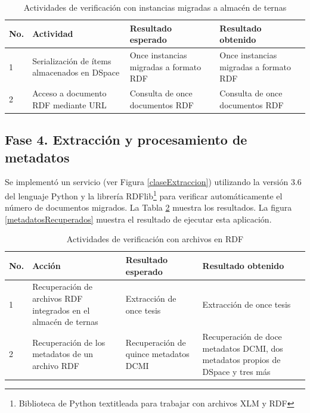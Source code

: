 \begin{table}[htbp]
    \begin{center}
    \caption{Actividades de verificaci\'on con instancias migradas a almac\'en de ternas}
    \begin{tabular}{| p{1.5cm}| p{3.5cm} | p{3.5cm} | p{3.5cm} |}
    \hline
    \centering \textbf{No. } & \textbf{Actividad} & \textbf{Resultado esperado} & \textbf{Resultado obtenido} \\
    \hline \hline
    1 & Serializaci\'on de \'items almacenados en DSpace & Once instancias migradas a formato RDF & Once instancias migradas a formato RDF \\ \hline
    2 & Acceso a documento RDF mediante URL & Consulta de once documentos RDF & Consulta de once documentos RDF  \\ \hline
    \end{tabular}
    \label{tablaInstanciasRdf}
    \end{center}
\end{table}

\subsection{Fase 4. Extracci\'on y procesamiento de metadatos}

Se implement\'o un servicio (ver Figura \ref{claseExtraccion}) utilizando la versi\'on 3.6 del lenguaje Python y la librer\'ia RDFlib\footnote{Biblioteca de Python textitleada para trabajar con archivos XLM y RDF} para verificar autom\'aticamente el n\'umero de documentos migrados. La Tabla \ref{casosPruebaMetadatos} muestra los resultados. La figura \ref{metadatosRecuperados} muestra el resultado de ejecutar esta aplicaci\'on.\newline

\begin{table}[htbp]
    \begin{center}
    \caption{Actividades de verificaci\'on con archivos en RDF}
    \begin{tabular}{| p{1.5cm}| p{3.5cm} | p{3.5cm} | p{3.5cm} |}
    \hline
    \centering \textbf{No. } & \textbf{Acci\'on} & \textbf{Resultado esperado} & \textbf{Resultado obtenido} \\
    \hline \hline
    1 & Recuperaci\'on de archivos RDF integrados en el almac\'en de ternas  & Extracci\'on de once tesis & Extracci\'on de once tesis \\ \hline
    2 & Recuperaci\'on de los metadatos de un archivo RDF  & Recuperaci\'on de quince metadatos DCMI & Recuperaci\'on de doce metadatos DCMI, dos metadatos propios de DSpace y tres m\'as \\ \hline
    \end{tabular}
    \label{casosPruebaMetadatos}
    \end{center}
\end{table}

